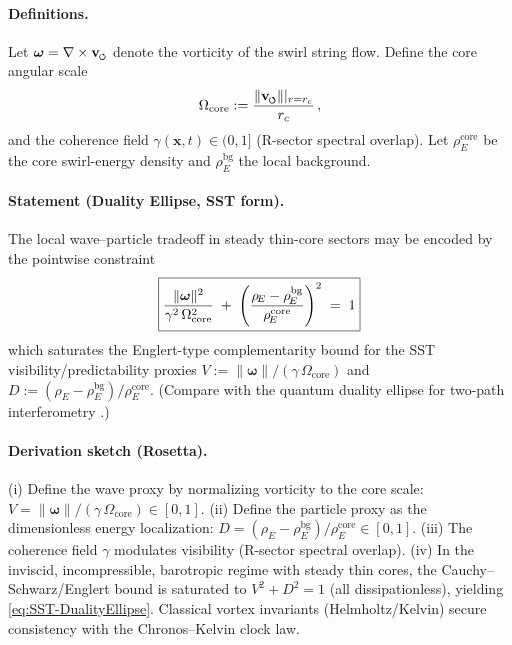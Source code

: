 \documentclass[reprint,aps,onecolumn,nofootinbib]{revtex4-2}
\newcommand{\swirlarrow}{%
    \mathchoice{\mkern-2mu\scriptstyle\boldsymbol{\circlearrowleft}}%
    {\mkern-2mu\scriptstyle\boldsymbol{\circlearrowleft}}%
    {\mkern-2mu\scriptscriptstyle\boldsymbol{\circlearrowleft}}%
    {\mkern-2mu\scriptscriptstyle\boldsymbol{\circlearrowleft}}%
}
\newcommand{\vswirl}{\mathbf{v}_{\swirlarrow}}
\newcommand{\vnorm}{\lVert \vswirl \rVert}               %
\newcommand{\rhoE}{\rho_{\!E}}                           %
\newcommand{\rc}{r_c}                                    %
\providecommand{\rc}{r_c}
\newcommand{\omegaVec}{\boldsymbol{\omega}}
\newcommand{\OmegaCore}{\Omega_{\mathrm{core}}}
\newcommand{\bg}{\mathrm{bg}}
\newcommand{\core}{\mathrm{core}}
\begin{document}
    \paragraph{Definitions.}
        Let $\omegaVec=\nabla\times\vswirl$ denote the vorticity of the swirl string flow.
        Define the core angular scale
        \begin{equation}
        \OmegaCore := \frac{\vnorm|_{r=\rc}}{\rc}\,,
        \end{equation}
        and the coherence field $\gamma(\mathbf x,t)\in(0,1]$ (R-sector spectral overlap).
        Let $\rhoE^{\core}$ be the core swirl-energy density and $\rhoE^{\bg}$ the local background.

    \paragraph{Statement (Duality Ellipse, SST form).}
        The local wave–particle tradeoff in steady thin-core sectors may be encoded by the pointwise constraint
        \begin{equation}
        \boxed{%
            \frac{\lVert\omegaVec\rVert^{2}}{\gamma^{2}\,\OmegaCore^{2}}
            \;+\;
            \left(\frac{\rhoE-\rhoE^{\bg}}{\rhoE^{\core}}\right)^{2}
            \;=\;1
        }
        \label{eq:SST-DualityEllipse}
        \end{equation}
        which saturates the Englert-type complementarity bound for the SST visibility/predictability proxies
        $V:=\lVert\omegaVec\rVert/(\gamma\,\OmegaCore)$ and $D:=(\rhoE-\rhoE^{\bg})/\rhoE^{\core}$.
        (Compare with the quantum duality ellipse for two-path interferometry \cite{Englert1996,KhatiwadaQian2025}.)

    \paragraph{Derivation sketch (Rosetta).}
    (i) Define the wave proxy by normalizing vorticity to the core scale:
        $V=\lVert\omegaVec\rVert/(\gamma\,\OmegaCore)\in[0,1]$.
        (ii) Define the particle proxy as the dimensionless energy localization:
        $D=(\rhoE-\rhoE^{\bg})/\rhoE^{\core}\in[0,1]$.
        (iii) The coherence field $\gamma$ modulates visibility (R-sector spectral overlap).
        (iv) In the inviscid, incompressible, barotropic regime with steady thin cores, the Cauchy–Schwarz/Englert
        bound is saturated to $V^2+D^2=1$ (all dissipationless), yielding \eqref{eq:SST-DualityEllipse}.
        Classical vortex invariants (Helmholtz/Kelvin) secure consistency with the Chronos–Kelvin clock law.
\end{document}
